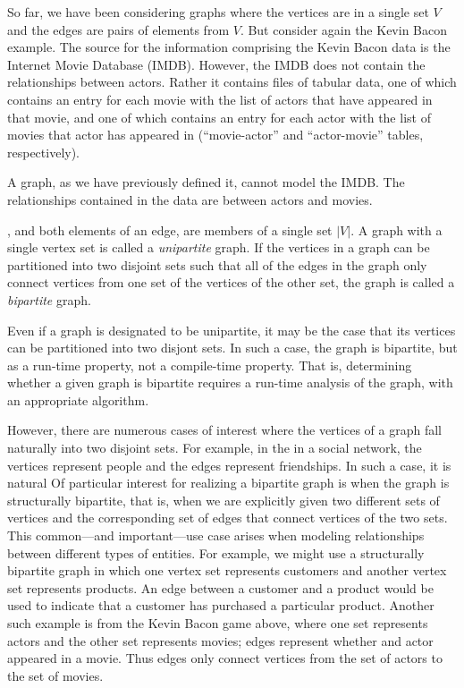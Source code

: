 
So far, we have been considering graphs where the vertices are in a single set $V$
and the edges are pairs of elements from $V$.  
%
%
But consider again the Kevin Bacon example.  The source for the information comprising the
Kevin Bacon data is the Internet Movie Database (IMDB).  However, the IMDB does not contain
the relationships between actors.  Rather it contains files of tabular data, one of which
contains an entry for each movie with the list of actors that have appeared in that movie,
and one of which contains an entry for each actor with the list of movies that actor has
appeared in (``movie-actor'' and ``actor-movie'' tables, respectively).

A graph, as we have previously defined it, cannot model the IMDB.  The relationships
contained in the data are between actors and movies.



, and both elements of an
edge, are members of a single set $|V|$. A graph with a single vertex set is called a
\emph{unipartite} graph. If the vertices in a graph can be partitioned into two
disjoint sets such that all of the edges in the graph only connect vertices from one
set of the vertices of the other set, the graph is called a \emph{bipartite} graph.

Even if a graph is designated to be unipartite, it may be the case that its vertices
can be partitioned into two disjont sets. In such a case, the graph is bipartite,
but as a run-time property, not a compile-time property.
That is, determining whether a given graph is bipartite requires a run-time analysis
of the graph, with an appropriate algorithm.

However, there are numerous cases of interest where the vertices of a graph fall
naturally into two disjoint sets. For example, in the
in a social network, the vertices
represent people and the edges represent friendships. In such a case, it is natural
Of particular interest for realizing a bipartite graph is when the graph is
structurally bipartite, that is, when we are explicitly given two different
sets of vertices and the corresponding set of edges that connect vertices of the two sets.
This common---and important---use case arises when modeling relationships
between different types of entities. For example, we might use a structurally
bipartite graph in which one vertex set represents customers and another vertex
set represents products. An edge between a customer and a product would be used
to indicate that a customer has purchased a particular product.
Another such example is from the Kevin Bacon game above, where
one set represents actors and the other set represents movies; edges represent whether
and actor appeared in a movie. Thus edges only connect vertices from the set of actors
to the set of movies.


